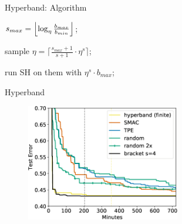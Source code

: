 \begin{frame}{Hyperband: Algorithm}
\begin{minipage}{0.75\textwidth}
\begin{algorithm}[H]
    \LinesNumbered
    \SetAlgoLined
    \setcounter{AlgoLine}{0}
    \DeclarePairedDelimiter\ceil{\lceil}{\rceil}
    \DeclarePairedDelimiter\floor{\lfloor}{\rfloor}
    
    
    $s_{max}=\floor*{\log_{\eta}\frac{b_{max}}{b_{min}}}$;\
    
    {
        sample $\eta=\lceil\frac{s_{max}+1}{s+1} \cdot\eta^{s}\rceil$;\
        
        run SH on them with $\eta^{s}\cdot b_{max}$;\
    }
 
        
    
    \caption{Pseudocode for Hyperband using SuccessiveHalving (SH) as a subroutine}
\end{algorithm}
\end{minipage}
\end{frame}
\begin{frame}{Hyperband}
\begin{figure}
    \centering
    \includegraphics[width=0.6\textwidth]{w07_hpo_grey_box/images/hyperband/Figure_experiments.png}
\end{figure}

    
\end{frame}

